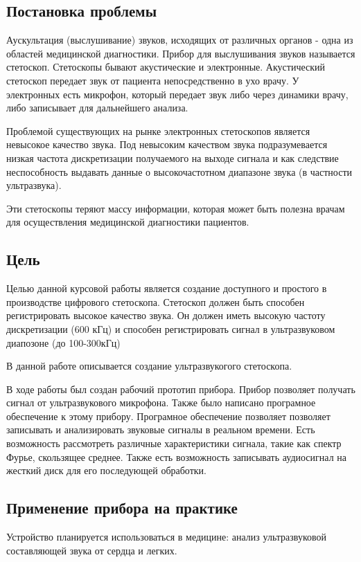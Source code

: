 \documentclass[../paper.tex]{subfiles}
\begin{document}
\subsection{Постановка проблемы}
Аускультация (выслушивание) звуков, исходящих от различных органов - одна из областей медицинской диагностики. Прибор для выслушивания звуков называется стетоскоп. Стетоскопы бывают акустические и электронные. Акустический стетоскоп передает звук от пациента непосредственно в ухо врачу. У электронных есть микрофон, который передает звук либо через динамики врачу, либо записывает для дальнейшего анализа.

Проблемой существующих на рынке электронных стетоскопов является невысокое качество звука. Под невысоким качеством звука подразумевается низкая частота дискретизации получаемого на выходе сигнала и как следствие неспособность выдавать данные о высокочастотном диапазоне звука (в частности ультразвука).

Эти стетоскопы теряют массу информации, которая может быть полезна врачам для осуществления медицинской диагностики пациентов.

\subsection{Цель}
Целью данной курсовой работы является создание доступного и простого в производстве цифрового стетоскопа. Стетоскоп должен быть способен регистрировать высокое качество звука. Он должен иметь высокую частоту дискретизации (600 кГц) и способен регистрировать сигнал в ультразвуковом диапозоне (до 100-300кГц)

В данной работе описывается создание ультразвукогого стетоскопа.

В ходе работы был создан рабочий прототип прибора. Прибор позволяет получать сигнал от ультразвукового микрофона. Также было написано програмное обеспечение к этому прибору. Програмное обеспечение позволяет позволяет записывать и анализировать звуковые сигналы в реальном времени. Есть возможность рассмотреть различные характеристики сигнала, такие как спектр Фурье, скользящее среднее. Также есть возможность записывать аудиосигнал на жесткий диск для его последующей обработки.

\subsection{Применение прибора на практике}
Устройство планируется использоваться в медицине: анализ ультразвуковой составляющей звука от сердца и легких.
\end{document}

